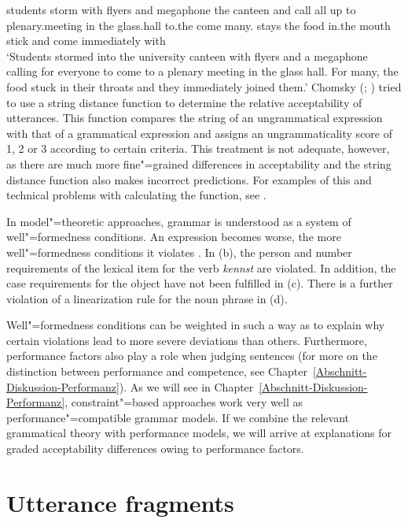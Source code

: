 students storm with flyers and megaphone the canteen and call all up to plenary.meeting in the glass.hall to.the come many.\dat{} stays the food in.the mouth stick and come immediately with\\
\glt `Students stormed into the university canteen with flyers and a megaphone calling for everyone to come to a plenary meeting
in the glass hall. For many, the food stuck in their throats and they immediately joined them.'
\z
Chomsky (\citeyear[Chapter~5]{Chomsky75a}; \citeyear{Chomsky64a}) tried to use a string distance function to determine the relative
acceptability of utterances. This function compares the string of an ungrammatical expression with that of a grammatical expression
and assigns an ungrammaticality score of 1, 2 or 3 according to certain criteria. This treatment is not adequate, however, as there
are much more fine"=grained differences in acceptability and the string distance function also makes incorrect predictions.
For examples of this and technical problems with calculating the function, see .

In model"=theoretic approaches, grammar is understood as a system of well"=formedness conditions. An expression becomes worse, the
more well"=formedness conditions it violates \citep[--27]{PS2001a}. In (b), the person and number requirements of
the lexical item for the verb \emph{kennst} are violated. In addition, the case requirements for the object have not been fulfilled in
(c). There is a further violation of a linearization rule for the noun phrase in (d).

Well"=formedness conditions can be weighted in such a way as to explain why certain violations lead to more severe deviations than
others. Furthermore, performance factors also play a role when judging sentences (for more on the distinction between performance
and competence, see Chapter~\ref{Abschnitt-Diskussion-Performanz}). As we will see in Chapter~\ref{Abschnitt-Diskussion-Performanz},
constraint"=based approaches work very well as performance"=compatible grammar models. If we combine the relevant grammatical theory
with performance models, we will arrive at explanations for graded acceptability differences owing to performance factors.

\section{Utterance fragments}

